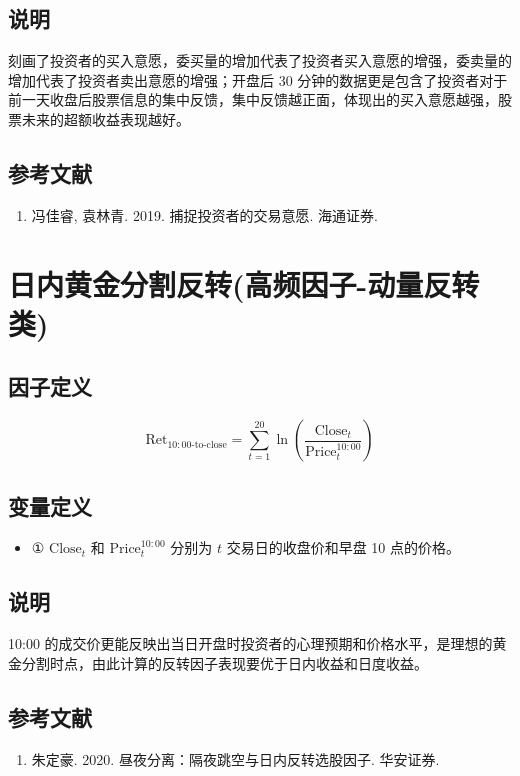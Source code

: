 \documentclass{article}
\begin{document}
\subsection{说明}
刻画了投资者的买入意愿，委买量的增加代表了投资者买入意愿的增强，委卖量的增加代表了投资者卖出意愿的增强；开盘后 30 分钟的数据更是包含了投资者对于前一天收盘后股票信息的集中反馈，集中反馈越正面，体现出的买入意愿越强，股票未来的超额收益表现越好。

\subsection{参考文献}
\begin{enumerate}
    \item 冯佳睿, 袁林青. 2019. 捕捉投资者的交易意愿. 海通证券.
\end{enumerate}

\section{日内黄金分割反转(高频因子-动量反转类)}

\subsection{因子定义}

\begin{equation}
    \mathrm{Ret}_{10:00\text{-to-close}} = \sum_{t=1}^{20} \ln \left( \frac{\mathrm{Close}_t}{\mathrm{Price}_t^{10:00}} \right)
\end{equation}

\subsection{变量定义}
\begin{itemize}
    \item ① \( \mathrm{Close}_t \) 和 \( \mathrm{Price}_t^{10:00} \) 分别为 \( t \) 交易日的收盘价和早盘 10 点的价格。
\end{itemize}

\subsection{说明}
10:00 的成交价更能反映出当日开盘时投资者的心理预期和价格水平，是理想的黄金分割时点，由此计算的反转因子表现要优于日内收益和日度收益。

\subsection{参考文献}
\begin{enumerate}
    \item 朱定豪. 2020. 昼夜分离：隔夜跳空与日内反转选股因子. 华安证券.
\end{enumerate}
\end{document}
